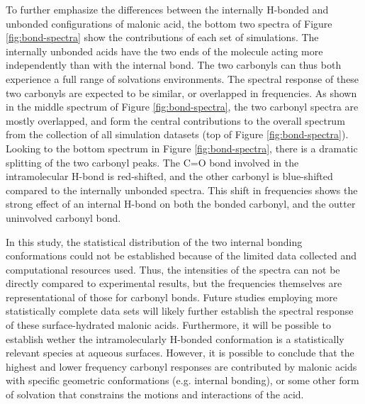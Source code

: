To further emphasize the differences between the internally H-bonded and unbonded configurations of malonic acid, the bottom two spectra of Figure \ref{fig:bond-spectra} show the contributions of each set of simulations. The internally unbonded acids have the two ends of the molecule acting more independently than with the internal bond. The two carbonyls can thus both experience a full range of solvations environments. The spectral response of these two carbonyls are expected to be similar, or overlapped in frequencies. As shown in the middle spectrum of Figure \ref{fig:bond-spectra}, the two carbonyl spectra are mostly overlapped, and form the central contributions to the overall spectrum from the collection of all simulation datasets (top of Figure \ref{fig:bond-spectra}). Looking to the bottom spectrum in Figure \ref{fig:bond-spectra}, there is a dramatic splitting of the two carbonyl peaks. The C=O bond involved in the intramolecular H-bond is red-shifted, and the other carbonyl is blue-shifted compared to the internally unbonded spectra. This shift in frequencies shows the strong effect of an internal H-bond on both the bonded carbonyl, and the outter uninvolved carbonyl bond.

In this study, the statistical distribution of the two internal bonding conformations could not be established because of the limited data collected and computational resources used. Thus, the intensities of the spectra can not be directly compared to experimental results, but the frequencies themselves are representational of those for carbonyl bonds. Future studies employing more statistically complete data sets will likely further establish the spectral response of these surface-hydrated malonic acids. Furthermore, it will be possible to establish wether the intramolecularly H-bonded conformation is a statistically relevant species at aqueous surfaces. However, it is possible to conclude that the highest and lower frequency carbonyl responses are contributed by malonic acids with specific geometric conformations (e.g. internal bonding), or some other form of solvation that constrains the motions and interactions of the acid.
